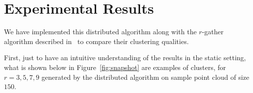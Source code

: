 
\section{Experimental Results}


We have implemented this distributed algorithm along with the $r$-gather algorithm described in~\cite{Aggarwal06achievinganonymity} to compare their clustering qualities. 


First, just to have an intuitive understanding of the results in the static setting, what is shown below in Figure~\ref{fig:snapshot} are examples of clusters, for $r=3,5,7,9$  generated by the distributed algorithm on sample point cloud of size $150$. 


